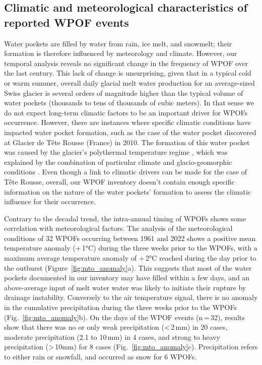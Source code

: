 \subsection{ Climatic and meteorological characteristics of reported WPOF events}
\label{sec:envelop_meteo}

Water pockets are filled by water from rain, ice melt, and snowmelt; their formation is therefore influenced by meteorology and climate. However, our temporal analysis reveals no significant change in the frequency of WPOF over the last century. This lack of change is unsurprising, given that in a typical cold or warm summer, overall daily glacial melt water production \citep[cf.][]{cremona&al2023} for an average-sized Swiss glacier is several orders of magnitude higher than the typical volume of water pockets (thousands to tens of thousands of cubic meters). In that sense we do not expect long-term climatic factors to be an important driver for WPOFs occurrence. However, there are instances where specific climatic conditions have impacted water pocket formation, such as the case of the water pocket discovered at Glacier de Tête Rousse (France) in 2010. The formation of this water pocket was caused by the glacier's polythermal temperature regime \citep{Vincent&al2012}, which was explained by the combination of particular climate and glacio-geomorphic conditions \citep[see][]{Gilbert&al2012}. Even though a link to climatic drivers can be made for the case of Tête Rousse, overall, our WPOF inventory doesn't contain enough specific information on the nature of the water pockets' formation to assess the climatic influence for their occurrence. 

Contrary to the decadal trend, the intra-annual timing of WPOFs shows some correlation with meteorological factors. The analysis of the meteorological conditions of 32 WPOFs occurring between 1961 and 2022 shows a positive mean temperature anomaly (+\,1°C) during the three weeks prior to the WPOFs, with a maximum average temperature anomaly of +\,2°C reached during the day prior to the outburst (Figure~\ref{fig:mto_anomaly}a). This suggests that most of the water pockets documented in our inventory may have filled within a few days, and an above-average input of melt water water was likely to initiate their rupture by drainage instability. Conversely to the air temperature signal, there is no anomaly in the cumulative precipitation during the three weeks prior to the WPOFs (Fig.~\ref{fig:mto_anomaly}b). On the days of the WPOF events (n\,=\,32), results show that there was no or only weak precipitation (<\,2\,mm) in  20 cases, moderate precipitation (2.1 to 10\,mm) in 4 cases, and strong to heavy precipitation (>\,10mm) for 8 cases (Fig.~\ref{fig:mto_anomaly}c). Precipitation refers to either rain or snowfall, and occurred as snow for 6 WPOFs. 



